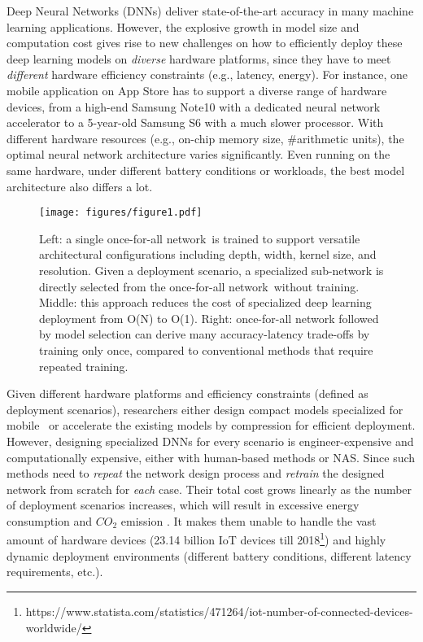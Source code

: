 \documentclass{article} \usepackage{iclr2020_conference,times}
\newcommand{\motherNet}{once-for-all network}
\begin{document}
Deep Neural Networks (DNNs) deliver state-of-the-art accuracy in many machine learning applications.
However, the explosive growth in model size and computation cost gives rise to new challenges on how to efficiently deploy these deep learning models on \emph{diverse} hardware platforms, since they have to meet \emph{different} hardware efficiency constraints (e.g., latency, energy). 
For instance, one mobile application on App Store has to support a diverse range of hardware devices, from a high-end Samsung Note10 with a dedicated neural network accelerator to a 5-year-old Samsung S6 with a much slower processor. With different hardware resources (e.g., on-chip memory size, \#arithmetic units), the optimal neural network architecture varies significantly. Even running on the same hardware, under different battery conditions or workloads, the best model architecture also differs a lot. 


\begin{figure}[t]
    \vspace{-5pt}
    \centering
    \texttt{[image: figures/figure1.pdf]}
    \caption{Left: a single \motherNet~is trained to support versatile architectural configurations including depth, width, kernel size, and resolution. Given a deployment scenario, a specialized sub-network is directly selected from the \motherNet~without training. Middle: this approach reduces the cost of specialized deep learning deployment from O(N) to O(1). Right: once-for-all network followed by model selection can derive many accuracy-latency trade-offs by training only once, compared to conventional methods that require repeated training. 
    }\label{fig:large_scale_deep_learning_deployment}
\end{figure}

Given different hardware platforms and efficiency constraints (defined as deployment scenarios), researchers either design compact models specialized for mobile~\citep{howard2017mobilenets,sandler2018mobilenetv2,zhang2018shufflenet} or accelerate the existing models by compression \citep{han2016deep, he2018amc} for efficient deployment. However, designing specialized DNNs for every scenario is engineer-expensive and computationally expensive, either with human-based methods or NAS. Since such methods need to \emph{repeat} the network design process and \emph{retrain} the designed network from scratch for \emph{each} case. Their total cost grows linearly as the number of deployment scenarios increases, which will result in excessive energy consumption and $CO_2$ emission \citep{strubell2019energy}. It makes them unable to handle the vast amount of hardware devices (23.14 billion IoT devices till 2018\footnote{https://www.statista.com/statistics/471264/iot-number-of-connected-devices-worldwide/}) and highly dynamic deployment environments (different battery conditions, different latency requirements, etc.). 
\end{document}
